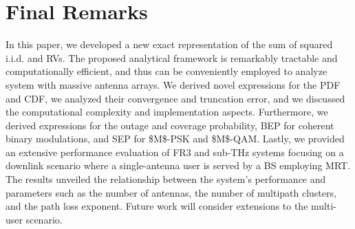 \documentclass[journal,twocolumn]{IEEEtran}
\begin{document}
\section{Final Remarks} \label{sec:final}
In this paper, we developed a new exact representation of the sum of squared \ac{i.i.d.} \Ehm{} and \km{} \acp{RV}. The proposed analytical framework is remarkably tractable and computationally efficient, and thus can be conveniently employed to analyze system with massive antenna arrays. We derived novel expressions for the \ac{PDF} and \ac{CDF}, we analyzed their convergence and truncation error, and we discussed the computational complexity and implementation aspects. Furthermore, we derived expressions for the outage and coverage probability, \ac{BEP} for coherent binary modulations, and \ac{SEP} for \ac{$M$-PSK} and \ac{$M$-QAM}. Lastly, we provided an extensive performance evaluation of FR3 and sub-THz systems focusing on a downlink scenario where a single-antenna user is served by a \ac{BS} employing \ac{MRT}. The results unveiled the relationship between the system's performance and parameters such as the number of antennas, the number of multipath clusters, and the path loss exponent. Future work will consider extensions to the multi-user scenario.




\end{document}
